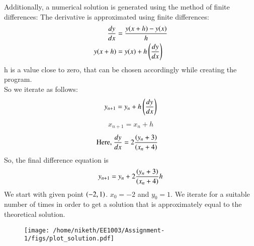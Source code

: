 \documentclass[journal]{IEEEtran}
\numberwithin{equation}{enumi}
\numberwithin{figure}{enumi}
\begin{document}
Additionally, a numerical solution is generated using the method of finite differences:
The derivative is approximated using finite differences:
	\begin{align}
    \frac{dy}{dx}&=\frac{y(x+h)-y(x)}{h}\\
    y(x+h)&=y(x)+h\left(\frac{dy}{dx}\right)
	\end{align}
h is a value close to zero, that can be chosen accordingly while creating the program.\\
So we iterate as follows:
	\begin{align}
		y_{n+1}=y_{n} + h\left(\frac{dy}{dx}\right)
	\end{align}
	\begin{align}
		x_{n+1}=x_{n}+h
	\end{align}
	\begin{align}
		\text{Here, } \frac{dy}{dx}&=2\frac{\left(y_n+3\right)}{\left(x_n+4\right)}
	\end{align}
So, the final difference equation is
	\begin{align}
		y_{n+1} = y_n + 2\frac{\left(y_n+3\right)}{\left(x_n+4\right)}h
	\end{align}
We start with given point $\left(-2,1\right)$. $x_{0}=-2$ and $y_{0}=1$. We iterate for a suitable number of times in order to get a solution that is approximately equal to the theoretical solution.
\begin{figure}[!ht]
    \centering
    \texttt{[image: /home/niketh/EE1003/Assignment-1/figs/plot\_solution.pdf]}
    \caption{}
\end{figure}
\end{document}

